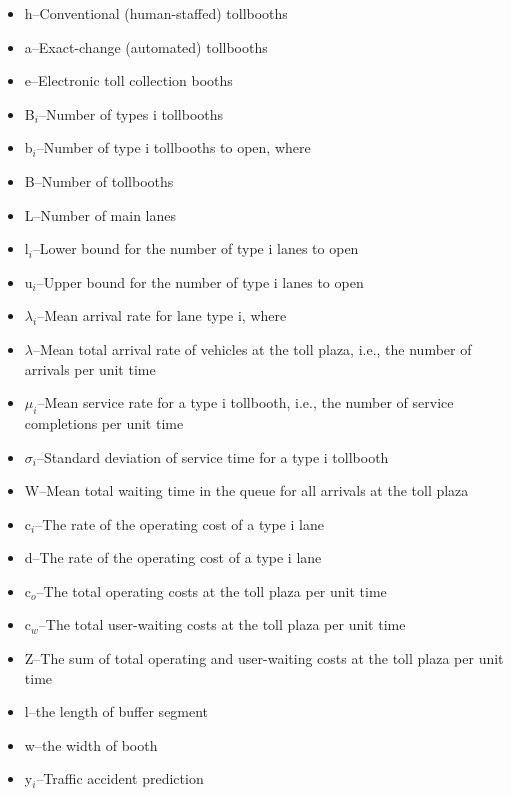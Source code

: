 \documentclass{mcmthesis}
\begin{document}
        \begin{itemize}
              \item h--Conventional (human-staffed) tollbooths
              \item a--Exact-change (automated) tollbooths
              \item e--Electronic toll collection booths
              \item B$_{i}$--Number of types i tollbooths
              \item b$_{i}$--Number of type i tollbooths to open, where
              \item B--Number of tollbooths
              \item L--Number of main lanes
              \item l$_{i}$--Lower bound for the number of type i lanes to open
              \item u$_{i}$--Upper bound for the number of type i lanes to open
              \item $\lambda_{i}$--Mean arrival rate for lane type i, where
              \item $\lambda$--Mean total arrival rate of vehicles at the toll plaza, i.e., the number of arrivals per unit time
              \item $\mu_{i}$--Mean service rate for a type i tollbooth, i.e., the number of service completions per unit time
              \item $\sigma_{i}$--Standard deviation of service time for a type i tollbooth
              \item W--Mean total waiting time in the queue for all arrivals at the toll plaza
              \item c$_{i}$--The rate of the operating cost of a type i lane
              \item d--The rate of the operating cost of a type i lane
              \item c$_{o}$--The total operating costs at the toll plaza per unit time
              \item c$_{w}$--The total user-waiting costs at the toll plaza per unit time
              \item Z--The sum of total operating and user-waiting costs at the toll plaza per unit time
              \item l--the length of buffer segment
              \item w--the width of booth
              \item y$_{i}$--Traffic accident prediction
        \end{itemize}
\end{document}
